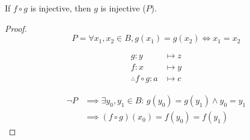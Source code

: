 \begin{question}

	If $f\circ g$ is injective, then $g$ is injective ($P$).

	\begin{proof}
		$$
			P = \forall x_1,x_2 \in B, g(x_1)=g(x_2) \iff x_1=x_2
		$$

		\begin{align*}
			g: y                   & \mapsto z \\
			f: x                   & \mapsto y \\
			\therefore f\circ g: a & \mapsto c
		\end{align*}

		\begin{align*}
			\neg P & \implies \exists y_0,y_1 \in B :\, g(y_0)=g(y_1) \wedge y_0 = y_1 \\
			       & \implies (f \circ g)(x_0) = f( y_0 ) = f(y_1)
		\end{align*}
	\end{proof}
\end{question}

